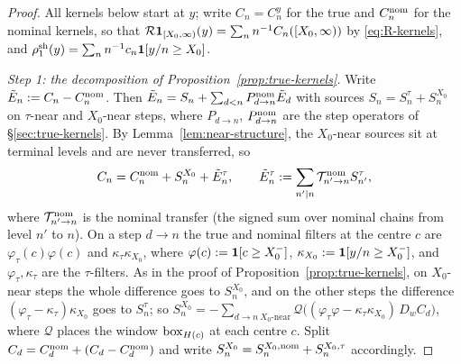 \begin{proof}
All kernels below start at $y$; write $C_n=C_n^y$ for the true and $C_n^{\mathrm{nom}}$ for the nominal kernels, so that
$\mathcal{R}\mathbf 1_{[X_0,\infty)}(y)=\sum_n n^{-1}C_n([X_0,\infty))$ by \eqref{eq:R-kernels}, and
$\rho^{\mathrm{sh}}_1(y)=\sum_n n^{-1}c_n\mathbf 1[y/n\ge X_0]$.

\emph{Step 1: the decomposition of Proposition~\ref{prop:true-kernels}.} Write $\tilde E_n:=C_n-C_n^{\mathrm{nom}}$. Then
$\tilde E_n=S_n+\sum_{d<n}P^{\mathrm{nom}}_{d\to n}\tilde E_d$ with sources $S_n=S_n^\tau+S_n^{X_0}$ on $\tau$-near and $X_0$-near
steps, where $P_{d\to n}$, $P^{\mathrm{nom}}_{d\to n}$ are the step operators of \S\ref{sec:true-kernels}. By Lemma~\ref{lem:near-structure}, the $X_0$-near sources sit at terminal levels and are never
transferred, so
\[
  C_n=C_n^{\mathrm{nom}}+S_n^{X_0}+\tilde E_n^\tau,\qquad \tilde E_n^\tau:=\sum_{n'\mid n}\mathcal T^{\mathrm{nom}}_{n'\to n}S^\tau_{n'},
\]
where $\mathcal T^{\mathrm{nom}}_{n'\to n}$ is the nominal transfer (the signed sum over nominal chains from level $n'$ to $n$).
On a step $d\to n$ the true and nominal filters at the centre $c$ are $\varphi_\tau(c)\varphi(c)$ and
$\kappa_\tau\kappa_{X_0}$, where $\varphi(c):=\mathbf 1[c\ge X_0^{-}]$, $\kappa_{X_0}:=\mathbf 1[y/n\ge X_0^{-}]$, and
$\varphi_\tau,\kappa_\tau$ are the $\tau$-filters. As in the proof of Proposition~\ref{prop:true-kernels}, on $X_0$-near steps the
whole difference goes to $S^{X_0}_n$, and on the other steps the difference $(\varphi_\tau-\kappa_\tau)\kappa_{X_0}$ goes to $S^\tau_n$;
so $S_n^{X_0}=-\sum_{d\to n\ X_0\text{-near}}\mathcal Q\bigl((\varphi_\tau\varphi-\kappa_\tau\kappa_{X_0})\,D_wC_d\bigr)$, where $\mathcal Q$
places the window $\mathrm{box}_{H(c)}$ at each centre $c$. Split $C_d=C_d^{\mathrm{nom}}+(C_d-C_d^{\mathrm{nom}})$ and write
$S_n^{X_0}=S_n^{X_0,\mathrm{nom}}+S_n^{X_0,\tau}$ accordingly.


\end{proof}
